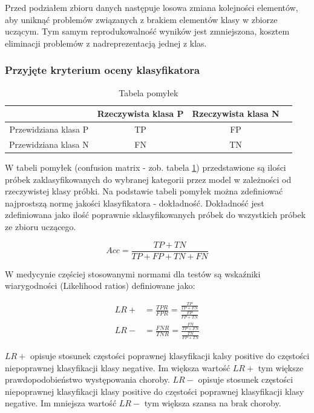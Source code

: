 \documentclass[12pt]{article}
\begin{document}
Przed podziałem zbioru danych następuje losowa zmiana kolejności elementów, aby uniknąć problemów związanych z brakiem elementów klasy w zbiorze uczącym. Tym samym reprodukowalność wyników jest zmniejszona, kosztem eliminacji problemów z nadreprezentacją jednej z klas.

\subsubsection{Przyjęte kryterium oceny klasyfikatora}

\begin{table}
\caption{Tabela pomyłek}
\label{conf matrix}
\centering
\begin{tabular}{|c|c|c|c|}
  \hline 
   & Rzeczywista klasa P & Rzeczywista klasa N \\
  \hline
  Przewidziana klasa P & TP & FP \\
  \hline
  Przewidziana klasa N & FN & TN \\
  \hline
\end{tabular}
\end{table}

W tabeli pomyłek (confusion matrix - zob. tabela \ref{conf matrix}) przedstawione są ilości próbek zaklasyfikowanych do wybranej kategorii przez model w zależności od rzeczywistej klasy próbki. Na podstawie tabeli pomyłek można zdefiniować najprostszą normę jakości klasyfikatora - dokładność. Dokładność jest zdefiniowana jako ilość poprawnie sklasyfikowanych próbek do wszystkich próbek ze zbioru uczącego.

\begin{equation}
	Acc = \frac{TP+TN}{TP+FP+TN+FN}
\end{equation}

W medycynie częściej stosowanymi normami dla testów są wskaźniki wiarygodności (Likelihood ratios) definiowane jako:

\begin{equation}
\begin{aligned}
	LR+ &= \frac{TPR}{FPR} = \frac{\frac{TP}{TP+FN}}{\frac{FP}{FP+TN}} \\ 
	LR- &= \frac{FNR}{TNR} = \frac{\frac{FN}{TP+FN}}{\frac{TN}{FP+TN}}
\end{aligned}
\end{equation}

$LR+$ opisuje stosunek częstości poprawnej klasyfikacji kalsy positive do częstości niepoprawnej klasyfikacji klasy negative. Im większa wartość $LR+$ tym większe prawdopodobieństwo występowania choroby.
$LR-$ opisuje stosunek częstości niepoprawnej klasyfikacji klasy positive do częstości poprawnej klasyfikacji klasy negative. Im mniejsza wartość $LR-$ tym większa szansa na brak choroby.
\end{document}
